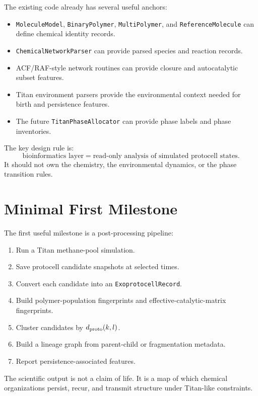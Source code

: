 \documentclass[11pt]{article}
\begin{document}
The existing code already has several useful anchors:
\begin{itemize}
\item \texttt{MoleculeModel}, \texttt{BinaryPolymer}, \texttt{MultiPolymer}, and \texttt{ReferenceMolecule} can define chemical identity records.
\item \texttt{ChemicalNetworkParser} can provide parsed species and reaction records.
\item ACF/RAF-style network routines can provide closure and autocatalytic subset features.
\item Titan environment parsers provide the environmental context needed for birth and persistence features.
\item The future \texttt{TitanPhaseAllocator} can provide phase labels and phase inventories.
\end{itemize}

The key design rule is:
\begin{equation}
\text{bioinformatics layer}
=
\text{read-only analysis of simulated protocell states}.
\end{equation}
It should not own the chemistry, the environmental dynamics, or the phase transition rules.

\section{Minimal First Milestone}

The first useful milestone is a post-processing pipeline:
\begin{enumerate}
\item Run a Titan methane-pool simulation.
\item Save protocell candidate snapshots at selected times.
\item Convert each candidate into an \texttt{ExoprotocellRecord}.
\item Build polymer-population fingerprints and effective-catalytic-matrix fingerprints.
\item Cluster candidates by $d_{\rm proto}(k,l)$.
\item Build a lineage graph from parent-child or fragmentation metadata.
\item Report persistence-associated features.
\end{enumerate}

The scientific output is not a claim of life. It is a map of which chemical organizations persist, recur, and transmit structure under Titan-like constraints.
\end{document}
